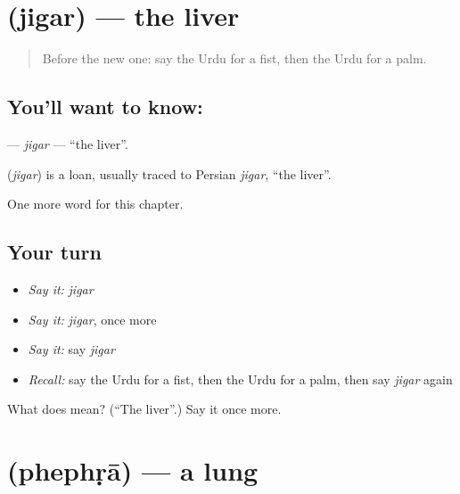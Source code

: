 \section[\texorpdfstring{\ur{جگر} (jigar)}{جگر (jigar)}]{ (jigar) — the liver}

\label{lesson:UR-C186-jigar}



\begin{quote}
Before the new one: say the Urdu for a fist, then the Urdu for a palm.
\end{quote}

\subsection*{You'll want to know: }
\textbf{} — \emph{jigar} — \textquotedblleft{}the liver\textquotedblright{}.

\begin{cousinweb}
\textbf{} (\emph{jigar}) is a loan, usually traced to Persian \emph{jigar}, \textquotedblleft{}the liver\textquotedblright{}.
\end{cousinweb}

\begin{grammarlens}[title={What you've built}]
One more word for this chapter.
\end{grammarlens}

\subsection*{Your turn}
\begin{itemize}
\raggedright
  \item \emph{Say it:} \emph{jigar}
  \item \emph{Say it:} \emph{jigar}, once more
  \item \emph{Say it:} say \emph{jigar}
  \item \emph{Recall:} say the Urdu for a fist, then the Urdu for a palm, then say \emph{jigar} again
\end{itemize}

\begin{tcolorbox}[breakable,colback=teal!4,colframe=teal!35!black,title={Before you move on}]
What does  mean? (\textquotedblleft{}The liver\textquotedblright{}.) Say it once more.
\end{tcolorbox}
\section[\texorpdfstring{\ur{پھیپھڑا} (phephṛā)}{پھیپھڑا (phephṛā)}]{ (phephṛā) — a lung}

